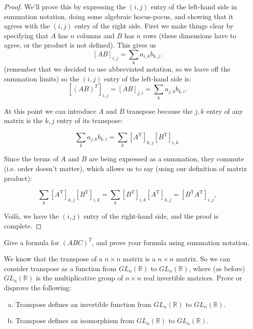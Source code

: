 \begin{proof}
We'll prove this by expressing the $(i,j)$ entry of the left-hand side in summation notation,  doing some algebraic hocus-pocus, and showing that it agrees with the $(i,j)$ entry of the right side.  First we make things clear by specifying that ${A}$ has $n$ columns and $B$ has $n$ rows (these dimensions have to agree, or the product is not defined). This gives us
\[ \left[ AB \right]_{i,j}= \sum_{k} a_{i,k} b_{k,j}. \]
(remember that we decided to use abbreviated notation, so we leave off the summation limits) so the $(i,j)$ entry of the left-hand side is:
 \[ \left[ (AB)^T \right]_{i,j} = \left[ AB \right]_{j,i} = \sum_{k} a_{j,k} b_{k,i}. \]

At this point we can introduce ${A}$ and ${B}$ transpose  because the $j,k$ entry of any matrix is the $k,j$ entry of its transpose:

\[  \sum_{k} a_{j,k} b_{k,i} =  \sum_{k} \left[A^{\text{T}}\right]_{k,j} \left[B^{\text{T}}\right]_{i,k.} \]

Since the terms of ${A}$ and ${B}$ are being expressed as a summation, they commute (i.e. order doesn't matter), which allows us to say (using our definition of matrix product):

\[ \sum_{k} \left[A^{\text{T}}\right]_{k,j} \left[B^{\text{T}}\right]_{i,k} = \sum_{k} \left[B^{\text{T}}\right]_{i,k}\left[A^{\text{T}}\right]_{k,j} = \left[ {B}^{\text{T}}{A}^{\text{T}} \right]_{i,j}, \]

Voil\`{a}, we have the $(i,j)$ entry of the right-hand side, and the proof is complete.
\end{proof}


\begin{exercise}{}
Give a formula for $(ABC)^T$, and prove your formula using summation notation.
\end{exercise}

\begin{exercise}{}
We know that the transpose of a $n \times n$ matrix is a $n \times n$ matrix.  So we can consider transpose as a function from $GL_n(\mathbb{R})$ to $GL_n(\mathbb{R})$, where (as before)  $GL_n(\mathbb{R})$  is the multiplicative group of $n \times n$ real invertible matrices. Prove or disprove the following:
\begin{enumerate}[(a)]
\item
Transpose defines an invertible function from $GL_n(\mathbb{R})$ to $GL_n(\mathbb{R})$.
\item
Transpose defines an isomorphism from $GL_n(\mathbb{R})$ to $GL_n(\mathbb{R})$.
\end{enumerate}
\end{exercise}

